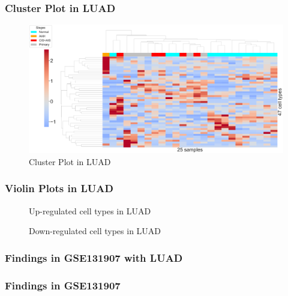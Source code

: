 \documentclass{beamer}
\begin{document}
    \begin{frame}
        \frametitle{Cluster Plot in LUAD}

        \begin{figure}
            \includegraphics[width=0.9 \linewidth]{figures/BisqueRNA/clustermap/STAR.FPKM.GSE131907.ADC.pdf}
            \caption{Cluster Plot in LUAD}
        \end{figure}
    \end{frame}

    \begin{frame}[allowframebreaks]
        \frametitle{Violin Plots in LUAD}

        \begin{figure}
            \caption{Up-regulated cell types in LUAD}
        \end{figure}

        \begin{figure}
            \caption{Down-regulated cell types in LUAD}
        \end{figure}
    \end{frame}

    \begin{frame}[allowframebreaks]
        \frametitle{Findings in GSE131907 with LUAD}
    \end{frame}

    \begin{frame}[allowframebreaks]
        \frametitle{Findings in GSE131907}
    \end{frame}
\end{document}
